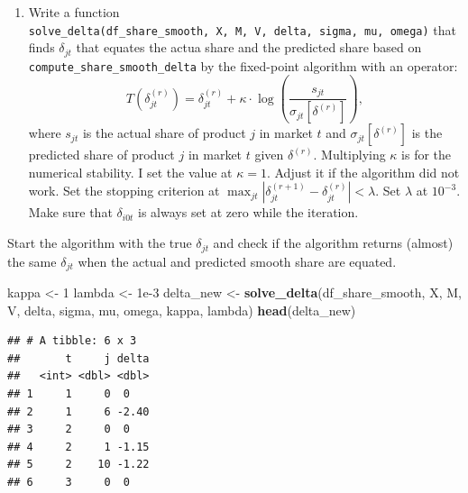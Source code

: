 \documentclass[]{book}
\newenvironment{Shaded}{\begin{snugshade}}{\end{snugshade}}
\newcommand{\KeywordTok}[1]{\textcolor[rgb]{0.13,0.29,0.53}{\textbf{#1}}}
\newcommand{\DecValTok}[1]{\textcolor[rgb]{0.00,0.00,0.81}{#1}}
\newcommand{\FloatTok}[1]{\textcolor[rgb]{0.00,0.00,0.81}{#1}}
\newcommand{\StringTok}[1]{\textcolor[rgb]{0.31,0.60,0.02}{#1}}
\newcommand{\OperatorTok}[1]{\textcolor[rgb]{0.81,0.36,0.00}{\textbf{#1}}}
\newcommand{\NormalTok}[1]{#1}
\providecommand{\tightlist}{%
  \setlength{\itemsep}{0pt}\setlength{\parskip}{0pt}}
\begin{document}
\begin{enumerate}
\def\labelenumi{\arabic{enumi}.}
\setcounter{enumi}{7}
\tightlist
\item
  Write a function
  \texttt{solve\_delta(df\_share\_smooth,\ X,\ M,\ V,\ delta,\ sigma,\ mu,\ omega)}
  that finds \(\delta_{jt}\) that equates the actua share and the
  predicted share based on \texttt{compute\_share\_smooth\_delta} by the
  fixed-point algorithm with an operator: \[
  T(\delta_{jt}^{(r)}) = \delta_{jt}^{(r)} + \kappa \cdot \log\left(\frac{s_{jt}}{\sigma_{jt}[\delta^{(r)}]}\right),
  \] where \(s_{jt}\) is the actual share of product \(j\) in market
  \(t\) and \(\sigma_{jt}[\delta^{(r)}]\) is the predicted share of
  product \(j\) in market \(t\) given \(\delta^{(r)}\). Multiplying
  \(\kappa\) is for the numerical stability. I set the value at
  \(\kappa = 1\). Adjust it if the algorithm did not work. Set the
  stopping criterion at
  \(\max_{jt}|\delta_{jt}^{(r + 1)} - \delta_{jt}^{(r)}| < \lambda\).
  Set \(\lambda\) at \(10^{-3}\). Make sure that \(\delta_{i0t}\) is
  always set at zero while the iteration.
\end{enumerate}

Start the algorithm with the true \(\delta_{jt}\) and check if the
algorithm returns (almost) the same \(\delta_{jt}\) when the actual and
predicted smooth share are equated.

\begin{Shaded}
\begin{Highlighting}[]
\NormalTok{kappa <-}\StringTok{ }\DecValTok{1}
\NormalTok{lambda <-}\StringTok{ }\FloatTok{1e-3}
\NormalTok{delta_new <-}
\StringTok{  }\KeywordTok{solve_delta}\NormalTok{(df_share_smooth, X, M, V, delta, sigma, mu, omega, kappa, lambda)}
\KeywordTok{head}\NormalTok{(delta_new)}
\end{Highlighting}
\end{Shaded}

\begin{verbatim}
## # A tibble: 6 x 3
##       t     j delta
##   <int> <dbl> <dbl>
## 1     1     0  0   
## 2     1     6 -2.40
## 3     2     0  0   
## 4     2     1 -1.15
## 5     2    10 -1.22
## 6     3     0  0
\end{verbatim}

\begin{Shaded}
\end{Shaded}
\end{document}
